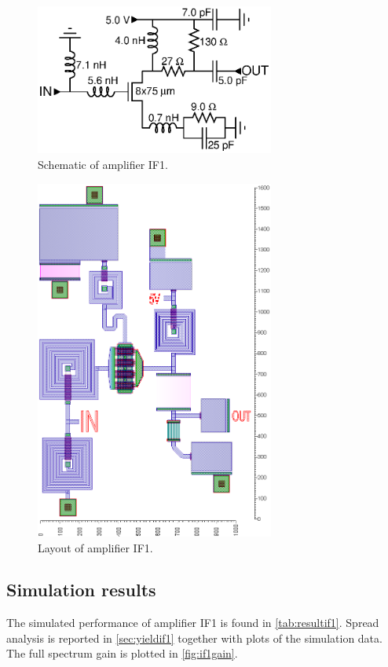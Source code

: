 			\begin{figure}[hbt!]
				\centering
				\includegraphics[width=0.7\textwidth]{fig/amplifiers/if1/sch_if1}
				\caption[Amplifier IF1 schematic.]{Schematic of amplifier IF1.}\label{fig:if1schematic}
			\end{figure}

			\begin{figure}[hbt!]
				\centering
				\includegraphics[width=0.7\textwidth]{fig/amplifiers/if1/layout}
				\caption[Amplifier IF1 layout.]{Layout of amplifier IF1.\scalemum}\label{fig:if1layout}
			\end{figure}

		\subsection{Simulation results}
			The simulated performance of amplifier IF1 is found in \autoref{tab:resultif1}. Spread analysis is reported in \autoref{sec:yieldif1} together with plots of the simulation data.  The full spectrum gain is plotted in \autoref{fig:if1gain}.

